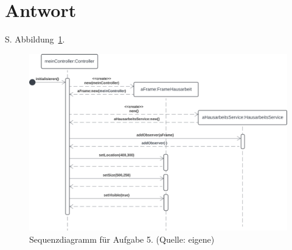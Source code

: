 \section*{Antwort}

S. Abbildung~\ref{fig:aufgabe5}.\\

\begin{figure}
    \centering
    \includegraphics[scale=0.35]{chapters/aufgabe 5/img/aufgabe5}
    \caption{Sequenzdiagramm für Aufgabe 5. (Quelle: eigene)}
    \label{fig:aufgabe5}
\end{figure}
